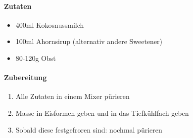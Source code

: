 \clearpage
{}

\paragraph{Zutaten}
\begin{itemize}[noitemsep]
	\item 400ml Kokosnussmilch
	\item 100ml Ahornsirup (alternativ andere Sweetener)
	\item 80-120g Obst 
\end{itemize}

\paragraph{Zubereitung}
\begin{enumerate}[noitemsep]
	\item Alle Zutaten in einem Mixer pürieren
	\item Masse in Eisformen geben und in das Tiefkühlfach geben
	\item Sobald diese festgefroren sind: nochmal pürieren
\end{enumerate}